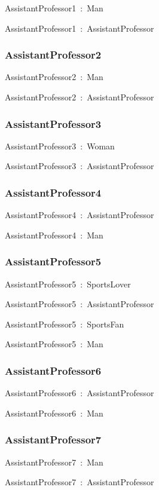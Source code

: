 \documentclass{article}
\begin{document}
AssistantProfessor1~:~Man

AssistantProfessor1~:~AssistantProfessor

\subsubsection*{AssistantProfessor2}

AssistantProfessor2~:~Man

AssistantProfessor2~:~AssistantProfessor

\subsubsection*{AssistantProfessor3}

AssistantProfessor3~:~Woman

AssistantProfessor3~:~AssistantProfessor

\subsubsection*{AssistantProfessor4}

AssistantProfessor4~:~AssistantProfessor

AssistantProfessor4~:~Man

\subsubsection*{AssistantProfessor5}

AssistantProfessor5~:~SportsLover

AssistantProfessor5~:~AssistantProfessor

AssistantProfessor5~:~SportsFan

AssistantProfessor5~:~Man

\subsubsection*{AssistantProfessor6}

AssistantProfessor6~:~AssistantProfessor

AssistantProfessor6~:~Man

\subsubsection*{AssistantProfessor7}

AssistantProfessor7~:~Man

AssistantProfessor7~:~AssistantProfessor
\end{document}
